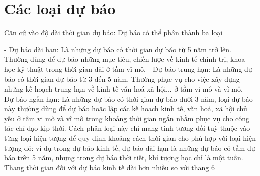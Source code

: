 \section{Các loại dự báo}
\label{sec:intro:phanloai}
Căn cứ vào độ dài thời gian dự báo: Dự báo có thể phân thành ba loại

- Dự báo dài hạn: Là những dự báo có thời gian dự báo từ 5 năm trở lên. Thường dùng để dự báo những mục tiêu, chiến lược về kinh tế chính trị, khoa học kỹ thuật trong thời gian dài ở tầm vĩ mô.
- Dự báo trung hạn: Là những dự báo có thời gian dự báo từ 3 đến 5 năm. Thường phục vụ cho việc xây dựng những kế hoạch trung hạn về kinh tế văn hoá xã hội... ở tầm vi mô và vĩ mô.
- Dự báo ngắn hạn: Là những dự báo có thời gian dự báo dưới 3 năm, loại dự báo này thường dùng để dự báo hoặc lập các kế hoạch kinh tế, văn hoá, xã hội chủ yếu ở tầm vi mô và vĩ mô trong khoảng thời gian ngắn nhằm phục vụ cho công tác chỉ đạo kịp thời.
Cách phân loại này chỉ mang tính tương đối tuỳ thuộc vào từng loại hiện tượng để quy định khoảng cách thời gian cho phù hợp với loại hiện tượng đó: ví dụ trong dự báo kinh tế, dự báo dài hạn là những dự báo có tầm dự báo trên 5 năm, nhưng trong dự báo thời tiết, khí tượng học chỉ là một tuần. Thang thời gian đối với dự báo kinh tế dài hơn nhiều so với thang
6

